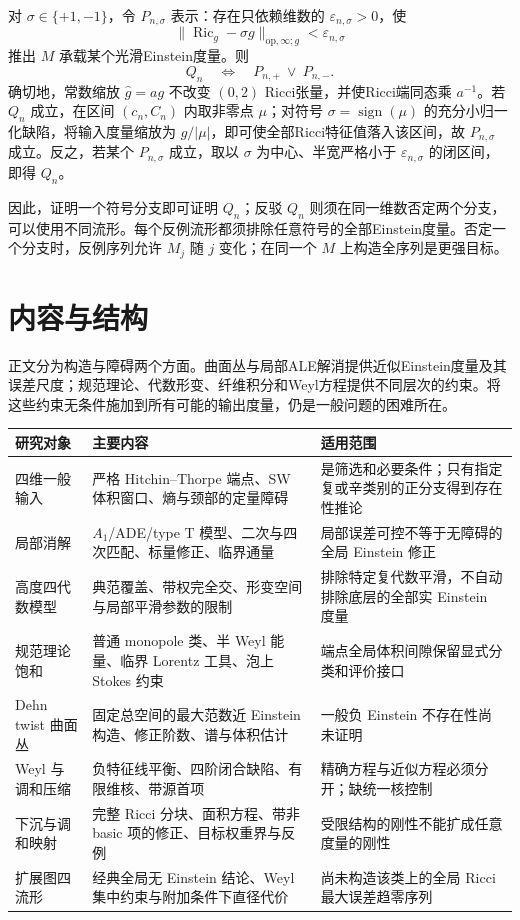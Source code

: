 \documentclass[UTF8,fontset=fandol,zihao=-4,oneside,openany]{ctexbook}
\theoremstyle{cjkplain}
\numberwithin{equation}{chapter}
\DeclareMathOperator{\Ric}{Ric}
\begin{document}
对 $\sigma\in\{+1,-1\}$，令 $P_{n,\sigma}$ 表示：存在只依赖维数的 $\varepsilon_{n,\sigma}>0$，使
\[
\|\Ric_g-\sigma g\|_{\mathrm{op},\infty;g}<\varepsilon_{n,\sigma}
\]
推出 $M$ 承载某个光滑Einstein度量。则
\[
Q_n\quad\Longleftrightarrow\quad P_{n,+}\ \lor\ P_{n,-}.
\]
确切地，常数缩放 $\widehat g=ag$ 不改变 $(0,2)$ Ricci张量，并使Ricci端同态乘 $a^{-1}$。若 $Q_n$ 成立，在区间 $(c_n,C_n)$ 内取非零点 $\mu$；对符号 $\sigma=\operatorname{sign}(\mu)$ 的充分小归一化缺陷，将输入度量缩放为 $g/|\mu|$，即可使全部Ricci特征值落入该区间，故 $P_{n,\sigma}$ 成立。反之，若某个 $P_{n,\sigma}$ 成立，取以 $\sigma$ 为中心、半宽严格小于 $\varepsilon_{n,\sigma}$ 的闭区间，即得 $Q_n$。

因此，证明一个符号分支即可证明 $Q_n$；反驳 $Q_n$ 则须在同一维数否定两个分支，可以使用不同流形。每个反例流形都须排除任意符号的全部Einstein度量。否定一个分支时，反例序列允许 $M_j$ 随 $j$ 变化；在同一个 $M$ 上构造全序列是更强目标。

\section*{内容与结构}
正文分为构造与障碍两个方面。曲面丛与局部ALE解消提供近似Einstein度量及其误差尺度；规范理论、代数形变、纤维积分和Weyl方程提供不同层次的约束。将这些约束无条件施加到所有可能的输出度量，仍是一般问题的困难所在。

\begin{longtable}{p{}p{}p{}}
\toprule
研究对象 & 主要内容 & 适用范围\\
\midrule
\endhead
四维一般输入 & 严格 Hitchin--Thorpe 端点、SW 体积窗口、熵与颈部的定量障碍 & 是筛选和必要条件；只有指定复或辛类别的正分支得到存在性推论\\
局部消解 & $A_1$/ADE/type T 模型、二次与四次匹配、标量修正、临界通量 & 局部误差可控不等于无障碍的全局 Einstein 修正\\
高度四代数模型 & 典范覆盖、带权完全交、形变空间与局部平滑参数的限制 & 排除特定复代数平滑，不自动排除底层的全部实 Einstein 度量\\
规范理论饱和 & 普通 monopole 类、半 Weyl 能量、临界 Lorentz 工具、泡上 Stokes 约束 & 端点全局体积间隙保留显式分类和评价接口\\
Dehn twist 曲面丛 & 固定总空间的最大范数近 Einstein 构造、修正阶数、谱与体积估计 & 一般负 Einstein 不存在性尚未证明\\
Weyl 与调和压缩 & 负特征线平衡、四阶闭合缺陷、有限维核、带源首项 & 精确方程与近似方程必须分开；缺统一核控制\\
下沉与调和映射 & 完整 Ricci 分块、面积方程、带非 basic 项的修正、目标权重界与反例 & 受限结构的刚性不能扩成任意度量的刚性\\
扩展图四流形 & 经典全局无 Einstein 结论、Weyl 集中约束与附加条件下直径代价 & 尚未构造该类上的全局 Ricci 最大误差趋零序列\\
\bottomrule
\end{longtable}
\end{document}
